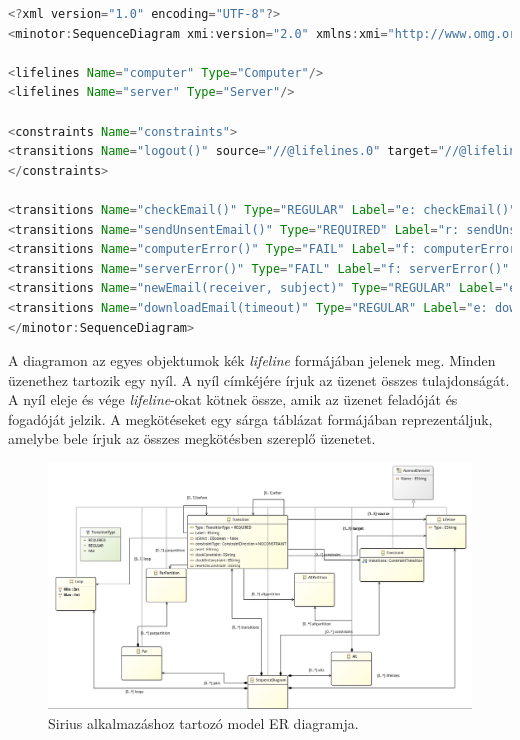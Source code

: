 \begin{lstlisting}[language=java, frame=single, float=ht!, caption={Szenárió diagram xml leírása.},captionpos=b]
<?xml version="1.0" encoding="UTF-8"?>
<minotor:SequenceDiagram xmi:version="2.0" xmlns:xmi="http://www.omg.org/XMI" xmlns:minotor="hu.bme.mit.mdsd.xboyz.erdiagram" Name="Email">

<lifelines Name="computer" Type="Computer"/>
<lifelines Name="server" Type="Server"/>

<constraints Name="constraints">
<transitions Name="logout()" source="//@lifelines.0" target="//@lifelines.1"/>
</constraints>

<transitions Name="checkEmail()" Type="REGULAR" Label="e: checkEmail()" source="//@lifelines.0" target="//@lifelines.0"  after="//@transitions.1" reset="x"/>
<transitions Name="sendUnsentEmail()" Type="REQUIRED" Label="r: sendUnsentEmail()" source="//@lifelines.0" target="//@lifelines.1" before="//@transitions.0" after="//@transitions.2"/>
<transitions Name="computerError()" Type="FAIL" Label="f: computerError()" source="//@lifelines.1" target="//@lifelines.0" before="//@transitions.1" after="//@transitions.3"/>
<transitions Name="serverError()" Type="FAIL" Label="f: serverError()" source="//@lifelines.0" target="//@lifelines.1" before="//@transitions.2" after="//@transitions.4"/>
<transitions Name="newEmail(receiver, subject)" Type="REGULAR" Label="e: newEmail(receiver, subject)" source="//@lifelines.0" target="//@lifelines.1" before="//@transitions.3" after="//@transitions.5" constraint="//@constraints.0" constraintType="PAST"/>
<transitions Name="downloadEmail(timeout)" Type="REGULAR" Label="e: downloadEmail(timeout)" source="//@lifelines.0" target="//@lifelines.1" before="//@transitions.4"   clockConstraint="x &gt; 10"/>
</minotor:SequenceDiagram>
\end{lstlisting}

A diagramon az egyes objektumok kék \textit{lifeline} formájában jelenek meg.
Minden üzenethez tartozik egy nyíl.
A nyíl címkéjére írjuk az üzenet összes tulajdonságát.
A nyíl eleje és vége \textit{lifeline}-okat kötnek össze, amik az üzenet feladóját és fogadóját jelzik.
A megkötéseket egy sárga táblázat formájában reprezentáljuk, amelybe bele írjuk az összes megkötésben szereplő üzenetet.

\begin{figure}[!ht]
    \centering
    \includegraphics[width=150mm, keepaspectratio]{figures/sirius-minotor-erdiagram.png}
    \caption{Sirius alkalmazáshoz tartozó model ER diagramja.}
\end{figure}
